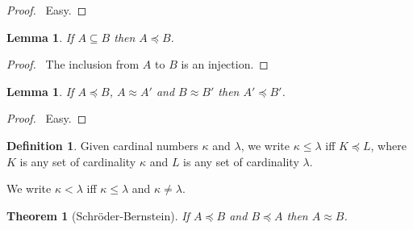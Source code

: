 \documentclass{report}
\let\qed\relax
\newtheorem{lemma}[axiom]{Lemma}
\newtheorem{theorem}[axiom]{Theorem}
\theoremstyle{definition}
\newtheorem{definition}[axiom]{Definition}
\begin{document}
    \begin{proof}
        \pf\ Easy. \qed
    \end{proof}

    \begin{lemma}
        If $A \subseteq B$ then $A \preccurlyeq B$.
    \end{lemma}

    \begin{proof}
        \pf\ The inclusion from $A$ to $B$ is an injection. \qed
    \end{proof}

    \begin{lemma}
        If $A \preccurlyeq B$, $A \approx A'$ and $B \approx B'$ then $A' \preccurlyeq B'$.
    \end{lemma}
    
    \begin{proof}
        \pf\ Easy. \qed
    \end{proof}

    \begin{definition}
        Given cardinal numbers $\kappa$ and $\lambda$, we write $\kappa \leq \lambda$ iff
        $K \preccurlyeq L$, where $K$ is any set of cardinality $\kappa$ and $L$ is any set of
        cardinality $\lambda$.

        We write $\kappa < \lambda$ iff $\kappa \leq \lambda$ and $\kappa \neq \lambda$.
    \end{definition}

    \begin{theorem}[Schr\"{o}der-Bernstein]
        If $A \preccurlyeq B$ and $B \preccurlyeq A$ then $A \approx B$.
    \end{theorem}
\end{document}
